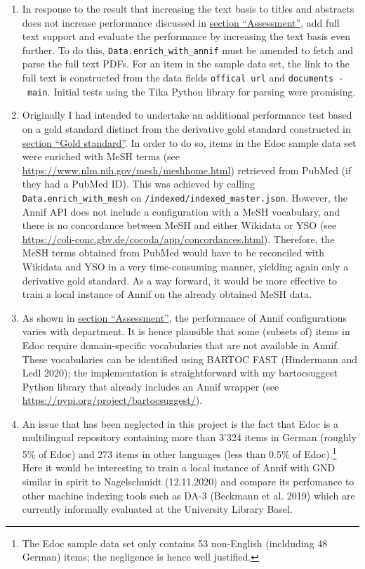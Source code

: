 \begin{enumerate}
\def\labelenumi{\arabic{enumi}.}
\item
  In response to the result that increasing the text basis to titles and
  abstracts does not increase performance discussed in
  \protect\hyperlink{assessment}{section ``Assessment''}, add full text
  support and evaluate the performance by increasing the text basis even
  further. To do this, \texttt{Data.enrich\_with\_annif} must be amended
  to fetch and parse the full text PDFs. For an item in the sample data
  set, the link to the full text is constructed from the data fields
  \texttt{offical\ url} and \texttt{documents\ -\ main}. Initial tests
  using the Tika Python library for parsing were promising.
\item
  Originally I had intended to undertake an additional performance test
  based on a gold standard distinct from the derivative gold standard
  constructed in \protect\hyperlink{gold-standard}{section ``Gold
  standard''}. In order to do so, items in the Edoc sample data set were
  enriched with MeSH terms (see
  \url{https://www.nlm.nih.gov/mesh/meshhome.html}) retrieved from
  PubMed (if they had a PubMed ID). This was achieved by calling
  \texttt{Data.enrich\_with\_mesh} on
  \texttt{/indexed/indexed\_master.json}. However, the Annif API does
  not include a configuration with a MeSH vocabulary, and there is no
  concordance between MeSH and either Wikidata or YSO (see
  \url{https://coli-conc.gbv.de/cocoda/app/concordances.html}).
  Therefore, the MeSH terms obtained from PubMed would have to be
  reconciled with Wikidata and YSO in a very time-consuming manner,
  yielding again only a derivative gold standard. As a way forward, it
  would be more effective to train a local instance of Annif on the
  already obtained MeSH data.
\item
  As shown in \protect\hyperlink{assessment}{section ``Assessment''},
  the performance of Annif configurations varies with department. It is
  hence plausible that some (subsets of) items in Edoc require
  domain-specific vocabularies that are not available in Annif. These
  vocabularies can be identified using BARTOC FAST (Hindermann and Ledl
  2020); the implementation is straightforward with my bartocsuggest
  Python library that already includes an Annif wrapper (see
  \url{https://pypi.org/project/bartocsuggest/}).
\item
  An issue that has been neglected in this project is the fact that Edoc
  is a multilingual repository containing more than 3'324 items in
  German (roughly 5\% of Edoc) and 273 items in other languages (less
  than 0.5\% of Edoc).\footnote{The Edoc sample data set only contains
    53 non-English (inclduding 48 German) items; the negligence is hence
    well justified.} Here it would be interesting to train a local
  instance of Annif with GND similar in spirit to Nagelschmidt
  (12.11.2020) and compare its perfomance to other machine indexing
  tools such as DA-3 (Beckmann et al. 2019) which are currently
  informally evaluated at the University Library Basel.
\end{enumerate}

